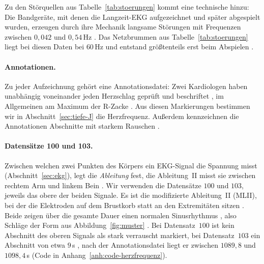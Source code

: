 \documentclass[a4paper,11pt,bibliography=totoc,listof=totoc,headinclude=true,cleardoublepage=empty,oneside]{scrbook}
\theoremstyle{plain}
\theoremstyle{definition}
\begin{document}
Zu den Störquellen aus Tabelle~\ref{tab:stoerungen} kommt eine technische
hinzu: Die Bandgeräte, mit denen die Langzeit-EKG aufgezeichnet und später
abgespielt wurden, erzeugen durch ihre Mechanik langsame Störungen mit
Frequenzen zwischen $0{,}042$ und $0{,}54$\,Hz
\cite[Abschn.~Introduction, Analog recording and playback]{mitdbdir}. %
Das Netzbrummen aus Tabelle~\ref{tab:stoerungen} liegt bei diesen Daten bei
$60$\,Hz und entstand grö\ss tenteils erst beim Abspielen
\cite[Abschn.~Technical Limitations of the Data]{mitbih}. %

\paragraph{Annotationen.}
Zu jeder Aufzeichnung gehört eine Annotationsdatei: Zwei Kardiologen haben
unabhängig voneinander jeden Herzschlag geprüft und beschriftet
\cite[Abschn.~Annotation]{mitbih}, %
im Allgemeinen am Maximum der R-Zacke
\cite[Abschn.~Introduction, Annotations]{mitdbdir}. Aus diesen Markierungen bestimmen wir in
Abschnitt~\ref{sec:tiefe-J} die Herzfrequenz. Au\ss erdem
kennzeichnen die Annotationen Abschnitte mit starkem Rauschen
\cite[Abschn.~Annotation]{mitbih}. %

\paragraph{Datensätze 100 und 103.}
Zwischen welchen zwei Punkten des Körpers ein EKG-Signal die Spannung misst
(Abschnitt~\ref{sec:ekg}), legt die \emph{Ableitung} fest, die Ableitung~II
misst sie zwischen rechtem Arm und linkem Bein
\cite[Kap.~2.1, Tab.~2.1]{rebstadt}. %
Wir verwenden die Datensätze $100$ und $103$, jeweils das obere der beiden
Signale. Es ist die modifizierte Ableitung~II (MLII), bei der die Elektroden
auf dem Brustkorb statt an den Extremitäten sitzen
\cite[Abschn.~ECG lead configuration; Records]{mitdbdir}. %
Beide zeigen über die gesamte Dauer einen normalen Sinusrhythmus
\cite[Abschn.~Records]{mitdbdir}, %
also Schläge der
Form aus Abbildung~\ref{fig:muster} \cite[Kap.~2.1, Abb.~2.2]{rebstadt}. %
Bei Datensatz~$100$ ist kein Abschnitt des oberen
Signals als stark verrauscht markiert, bei Datensatz~$103$ ein Abschnitt von
etwa $9$\,s \cite[Abschn.~Records]{mitdbdir}, %
nach der Annotationsdatei liegt er zwischen $1089{,}8$ und $1098{,}4$\,s
(Code in Anhang~\ref{anh:code-herzfrequenz}).
\end{document}
